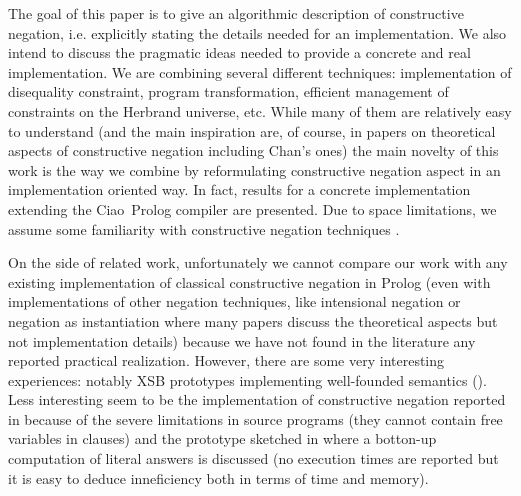 \documentclass{tlp}
\newcommand{\ciao}{Ciao}
\begin{document}
The goal of this paper is to give an algorithmic description of
constructive negation, i.e. explicitly stating the details needed for
an implementation. We also intend to discuss the pragmatic ideas
needed to provide a concrete and real implementation.  We are
combining several different techniques: implementation of disequality
constraint, program transformation, efficient management of
constraints on the Herbrand universe, etc. While many of them are
relatively easy to understand (and the main inspiration are, of
course, in papers on theoretical aspects of constructive negation
including Chan's ones) the main novelty of this work is the way we
combine by reformulating constructive negation aspect in an
implementation oriented way.  In fact, results for a concrete
implementation extending the \ciao\ Prolog compiler are presented.
Due to space limitations, we assume some familiarity with constructive
negation techniques \cite{Chan1,Chan2}.

On the side of related work, unfortunately we cannot compare our work
with any existing implementation of classical constructive negation in
Prolog (even with implementations of other negation techniques, like
intensional negation \cite{Barbuti1,Bruscoli,SusanaFLOPS04} or negation
as instantiation \cite{DiPierro} where many papers discuss the
theoretical aspects but not implementation details) because we have
not found in the literature any reported practical
realization. However, there are some very interesting experiences:
notably XSB prototypes implementing well-founded semantics
(\cite{Alferes95}). Less interesting seem to be the implementation of
constructive negation reported in \cite{Bartak} because of the severe
limitations in source programs (they cannot contain free variables in
clauses) and the prototype sketched in \cite{BNC-cneg} where a
botton-up computation of literal answers is discussed (no execution
times are reported but it is easy to deduce inneficiency both in terms
of time and memory).


\end{document}
